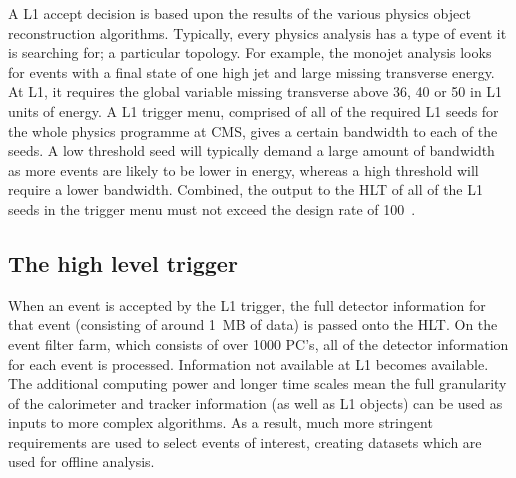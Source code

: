 A \ac{L1} accept decision is based upon the results of the various physics object reconstruction algorithms.
Typically, every physics analysis has a type of event it is searching for; a particular topology. 
For example, the monojet analysis looks for events with a final state of one high \pt jet and large missing transverse energy. 
At L1, it requires the global variable  missing transverse  above 36, 40 or 50 in \ac{L1} units of energy.
A L1 trigger menu, comprised of all of the required \ac{L1} seeds for the whole physics programme at \ac{CMS}, gives a certain bandwidth to each of the seeds. A low threshold seed will typically demand a large amount of bandwidth as more events are likely to be lower in energy, whereas a high threshold will require a lower bandwidth. 
Combined, the output to the \ac{HLT} of all of the \ac{L1} seeds in the trigger menu must not exceed the design rate of 100~\kHz.%


\subsection{The high level trigger}

When an event is accepted by the \ac{L1} trigger, the full detector information for that event (consisting of around 1~MB of data) is passed onto the \ac{HLT}.
On the event filter farm, which consists of over 1000 PC's, all of the detector information for each event is processed.
Information not available at \ac{L1} becomes available. 
The additional computing power and longer time scales mean the full granularity of the calorimeter and tracker information 
(as well as \ac{L1} objects) can be used as inputs to more complex algorithms.
As a result, much more stringent requirements are used to select events of interest, creating datasets which are used for offline analysis.


